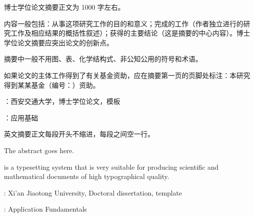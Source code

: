 
\setcounter{page}{1}

博士学位论文摘要正文为 1000 字左右。

内容一般包括：从事这项研究工作的目的和意义；完成的工作（作者独立进行的研究工作及相应结果的概括性叙述）；获得的主要结论（这是摘要的中心内容）。博士学位论文摘要应突出论文的创新点。

摘要中一般不用图、表、化学结构式、非公知公用的符号和术语。

如果论文的主体工作得到了有关基金资助，应在摘要第一页的页脚处标注：本研究得到某某基金（编号：）资助。


\vspace{\baselineskip}
：西安交通大学，博士学位论文，模板

\vspace{\baselineskip}
：应用基础

\clearpage


\noindent 英文摘要正文每段开头不缩进，每段之间空一行。\newline

\noindent The abstract goes here. \newline

\noindent {} is a typesetting system that is very suitable for producing scientific and mathematical documents of high typographical quality.

\vspace{\baselineskip}
: Xi'an Jiaotong University, Doctoral dissertation,  template

\vspace{\baselineskip}
: Application Fundamentals

\clearpage


\newpage 
